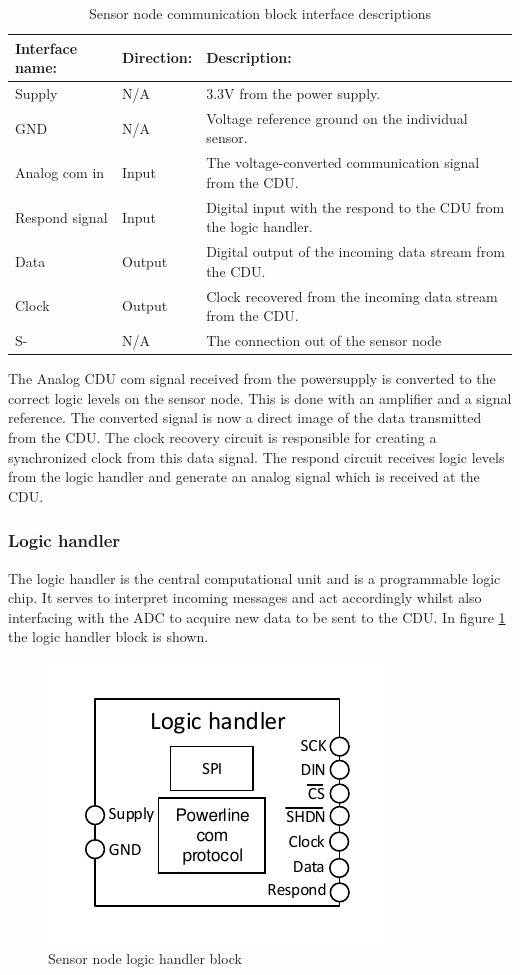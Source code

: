 \begin{table}[H]
	\centering
	\begin{tabular}{|p{3cm} |p{2cm} | p{8cm}| }
		\hline
		Interface name:	& Direction: 		& Description: \\ \hline
		Supply			& N/A				& 3.3V from the power supply. \\ \hline
		GND				& N/A				& Voltage reference ground on the individual sensor.\\\hline 
		Analog com in	& Input				& The voltage-converted communication signal from the CDU.\\ \hline
		Respond signal  & Input				& Digital input with the respond to the CDU from the logic handler. \\ \hline
		Data			& Output			& Digital output of the incoming data stream from the CDU.\\ \hline
		Clock			& Output			& Clock recovered from the incoming data stream from the CDU. \\ \hline
		S-				& N/A				& The connection out of the sensor node\\ \hline
	\end{tabular}
	\caption{Sensor node communication block interface descriptions}
\end{table}

The Analog CDU com signal received from the powersupply is converted to the correct logic levels on the sensor node. This is done with an amplifier and a signal reference. The converted signal is now a direct image of the data transmitted from the CDU. The clock recovery circuit is responsible for creating a synchronized clock from this data signal. The respond circuit receives logic levels from the logic handler and generate an analog signal which is received at the CDU.

\subsubsection{Logic handler}
The logic handler is the central computational unit and is a programmable logic chip. It serves to interpret incoming messages and act accordingly whilst also interfacing with the ADC to acquire new data to be sent to the CDU. In figure \ref{fig:sn_logic_handler} the logic handler block is shown.

\begin{figure}[H]
	\centering
	\includegraphics[width=.5\textwidth]{billeder/logic_handler_sn}
	\caption{Sensor node logic handler block}
	\label{fig:sn_logic_handler}
\end{figure}

